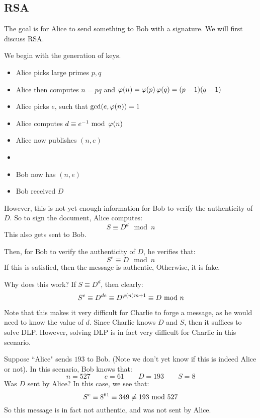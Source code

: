 \documentclass{article}
\begin{document}
\subsection{RSA}

The goal is for Alice to send something to Bob with a signature.
We will first discuss RSA.

We begin with the generation of keys.
\begin{itemize}
    \item Alice picks large primes $ p, q $
    \item Alice then computes $ n = pq $ and $ \operatorname{\varphi}(n) = \operatorname{\varphi}(p)\operatorname{\varphi}(q) = (p-1)(q-1) $
    \item Alice picks $ e $, such that $ \gcd(e, \operatorname{\varphi}(n)) = 1 $
    \item Alice computes $ d \equiv e^{-1} \ \mathrm{mod}\ \operatorname{\varphi}(n) $
    \item Alice now publishes $ (n, e) $
    \item[] ~
    \item Bob now has $ (n, e) $
    \item Bob received $ D $
\end{itemize}

However, this is not yet enough information for Bob to verify the authenticity of $ D $.
So to sign the document, Alice computes:
\begin{equation*}
    S \equiv D^{d} \mod n
\end{equation*}
This also gets sent to Bob.

Then, for Bob to verify the authenticity of $ D $, he verifies that:
\begin{equation*}
    S^{e} \equiv D \mod n
\end{equation*}
If this is satisfied, then the message is authentic, Otherwise, it is fake.

Why does this work?
If $ S \equiv D^{d} $, then clearly:
\begin{equation*}
    S^{e} \equiv D^{de} \equiv D^{\operatorname{\varphi}(n)m + 1} \equiv D \ \mathrm{mod}\ n
\end{equation*}

Note that this makes it very difficult for Charlie to forge a message,
as he would need to know the value of $ d $.
Since Charlie knows $ D $ and $ S $, then it suffices to solve DLP.
However, solving DLP is in fact very difficult for Charlie in this scenario.

\begin{xmp}[source=Primary Source Material]
    Suppose ``Alice" sends $ 193 $ to Bob. (Note we don't yet know if this is indeed Alice or not).
    In this scenario, Bob knows that:
    \begin{equation*}
        n = 527 \qquad e = 61 \qquad D = 193 \qquad S = 8
    \end{equation*}
    Was $ D $ sent by Alice? \vsp
    In this case, we see that:
    \begin{equation*}
        S^{e} \equiv 8^{61} \equiv 349 \cnot\equiv 193 \mod 527
    \end{equation*}
    So this message is in fact not authentic, and was not sent by Alice.
\end{xmp}
\end{document}
